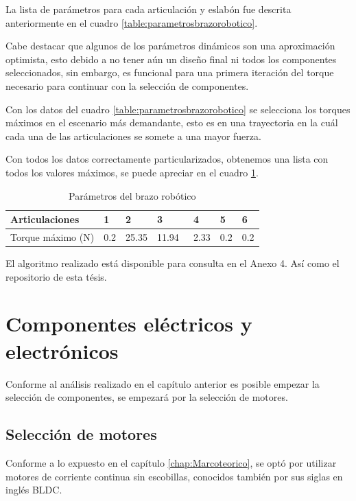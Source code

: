 La lista de parámetros para cada articulación y eslabón fue descrita anteriormente en el cuadro \ref{table:parametrosbrazorobotico}.

Cabe destacar que algunos de los parámetros dinámicos son una aproximación optimista, esto debido a no tener aún un diseño final ni todos los componentes seleccionados, sin embargo, es funcional para una primera iteración del torque necesario para continuar con la selección de componentes.

Con los datos del cuadro \ref{table:parametrosbrazorobotico} se selecciona los torques máximos en el escenario más demandante, esto es en una trayectoria en la cuál cada una de las articulaciones se somete a una mayor fuerza.

Con todos los datos correctamente particularizados, obtenemos una lista con todos los valores máximos, se puede apreciar en el cuadro \ref{table:maxtorque}. 

\begin{table}
\centering
\caption{Parámetros del brazo robótico}
\label{table:maxtorque}
\begin{tabular}{l|l|l|l|l|l|l|}
\textbf{Articulaciones}              &  1 & 2 & 3 &  4 &  5 &  6  \\ 
\hline
Torque máximo (N) & 0.2            & 25.35          & 11.94~         & 2.33           & 0.2            & 0.2            
\end{tabular}
\end{table}

El algoritmo realizado está disponible para consulta en el Anexo 4. Así como el repositorio de esta tésis.
       
\section{Componentes eléctricos y electrónicos}

Conforme al análisis realizado en el capítulo anterior es posible empezar la selección de componentes, se empezará por la selección de motores.

\subsection{Selección de motores}

Conforme a lo expuesto en el capítulo \ref{chap:Marcoteorico}, se optó por utilizar motores de corriente continua sin escobillas, conocidos también por sus siglas en inglés BLDC.

